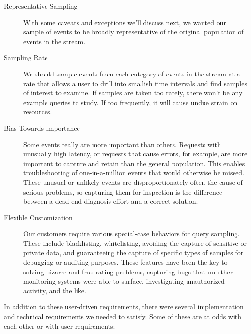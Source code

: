 \documentclass{vivid_layout}
\begin{document}
\begin{description}

\item[Representative Sampling] With some caveats and exceptions we'll discuss
next, we wanted our sample of events to be broadly representative of the
original population of events in the stream.

\item[Sampling Rate] We should sample events from each category of events in the
stream at a rate that allows a user to drill into smallish time intervals and
find samples of interest to examine. If samples are taken too rarely, there
won't be any example queries to study. If too frequently, it will cause undue
strain on resources.

\item[Bias Towards Importance] Some events really are more important than
others. Requests with unusually high latency, or requests that cause errors, for
example, are more important to capture and retain than the general population.
This enables troubleshooting of one-in-a-million events that would otherwise be
missed. These unusual or unlikely events are disproportionately often the cause
of serious problems, so capturing them for inspection is the difference between
a dead-end diagnosis effort and a correct solution.

\item[Flexible Customization] Our customers require various special-case
behaviors for query sampling. These include blacklisting, whitelisting, avoiding
the capture of sensitive or private data, and guaranteeing the capture of
specific types of samples for debugging or auditing purposes. These features
have been the key to solving bizarre and frustrating problems, capturing bugs
that no other monitoring systems were able to surface, investigating
unauthorized activity, and the like.

\end{description}

In addition to these user-driven requirements, there were several implementation
and technical requirements we needed to satisfy. Some of these are at odds with
each other or with user requirements:
\end{document}
